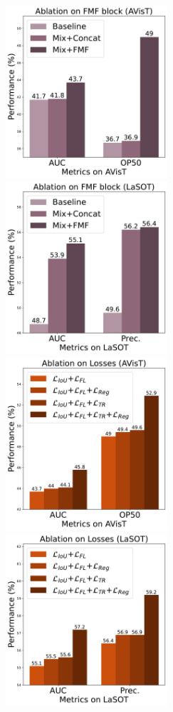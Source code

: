   \begin{figure}
	\centering
	 \includegraphics[width=6cm]{figures/abl_fmf_avist.pdf}
	 \includegraphics[width=6cm]{figures/abl_fmf_lasot.pdf}
	 \includegraphics[width=6cm]{figures/abl_losses_avist.pdf}
	 \includegraphics[width=6cm]{figures/abl_losses_lasot.pdf}

\end{figure}
